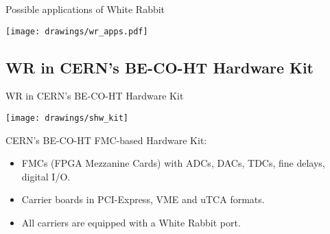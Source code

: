 \documentclass[compress,red]{beamer}
\begin{document}
\begin{frame}{Possible applications of White Rabbit}
\begin{center}
\texttt{[image: drawings/wr\_apps.pdf]}
\end{center}
\end{frame}


\subsection{WR in CERN's BE-CO-HT Hardware Kit}
\begin{frame}{WR in CERN's BE-CO-HT Hardware Kit}
\begin{center}

  \texttt{[image: drawings/shw\_kit]}

  \begin{block}{CERN's BE-CO-HT FMC-based Hardware Kit:}
    \begin{itemize}
    \item FMCs (FPGA Mezzanine Cards) with ADCs, DACs, TDCs, fine delays, digital I/O.
    \item Carrier boards in PCI-Express, VME and uTCA formats.
    \item All carriers are equipped with a White Rabbit port.
    \end{itemize}
  \end{block}

\end{center}
\end{frame}


\end{document}
